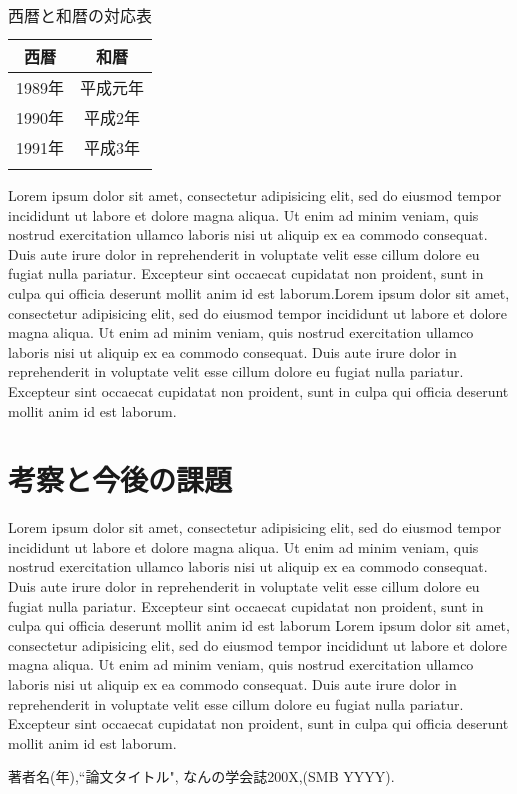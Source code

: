 \documentclass[a4j,10pt, twocolumn]{jarticle}
\begin{document}
\begin{table}[H]
\begin{center}
\caption{西暦と和暦の対応表}
\vspace{1zw}
\label{03AB-A2}
\begin{tabular}{cc}
\noalign{\hrule height 1pt}
西暦&和暦\\ \hline
1989年&平成元年\\
1990年&平成2年\\
1991年&平成3年\\
\noalign{\hrule height 1pt}
\end{tabular}
\end{center}
\end{table}

Lorem ipsum dolor sit amet, consectetur adipisicing elit, sed do eiusmod tempor incididunt ut labore et dolore magna aliqua. Ut enim ad minim veniam, quis nostrud exercitation ullamco laboris nisi ut aliquip ex ea commodo consequat. Duis aute irure dolor in reprehenderit in voluptate velit esse cillum dolore eu fugiat nulla pariatur. Excepteur sint occaecat cupidatat non proident, sunt in culpa qui officia deserunt mollit anim id est laborum.Lorem ipsum dolor sit amet, consectetur adipisicing elit, sed do eiusmod tempor incididunt ut labore et dolore magna aliqua. Ut enim ad minim veniam, quis nostrud exercitation ullamco laboris nisi ut aliquip ex ea commodo consequat. Duis aute irure dolor in reprehenderit in voluptate velit esse cillum dolore eu fugiat nulla pariatur. Excepteur sint occaecat cupidatat non proident, sunt in culpa qui officia deserunt mollit anim id est laborum.
\section{考察と今後の課題}
Lorem ipsum dolor sit amet, consectetur adipisicing elit, sed do eiusmod tempor incididunt ut labore et dolore magna aliqua. Ut enim ad minim veniam, quis nostrud exercitation ullamco laboris nisi ut aliquip ex ea commodo consequat. Duis aute irure dolor in reprehenderit in voluptate velit esse cillum dolore eu fugiat nulla pariatur. Excepteur sint occaecat cupidatat non proident, sunt in culpa qui officia deserunt mollit anim id est laborum
Lorem ipsum dolor sit amet, consectetur adipisicing elit, sed do eiusmod tempor incididunt ut labore et dolore magna aliqua. Ut enim ad minim veniam, quis nostrud exercitation ullamco laboris nisi ut aliquip ex ea commodo consequat. Duis aute irure dolor in reprehenderit in voluptate velit esse cillum dolore eu fugiat nulla pariatur. Excepteur sint occaecat cupidatat non proident, sunt in culpa qui officia deserunt mollit anim id est laborum.

\begin{thebibliography}{3}
 \label{takada}
著者名(年),``論文タイトル", なんの学会誌200X,(SMB YYYY).
\end{thebibliography}
\end{document}
